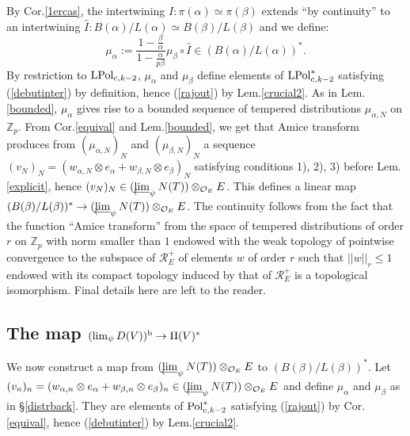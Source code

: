 \documentclass[11pt]{amsart}
\def\limproj{\mathop{\oalign{{\rm lim}\cr 
\hidewidth$\longleftarrow$\hidewidth\cr}}}
\def\Z{{\mathbb Z}_p}
\def\O{{\mathcal O}_E}
\begin{document}
By Cor.\ref{1ercas}, the intertwining $I:\pi(\alpha)\simeq \pi(\beta)$
extends ``by continuity'' to an intertwining $\hat
I:B(\alpha)/L(\alpha)\simeq B(\beta)/L(\beta)$ and we define:
$$\mu_{\alpha}:=\frac{1-\frac{\beta}{\alpha}}{1-\frac{\alpha}{p\beta}}\mu_{\beta}\circ
\hat I \in (B(\alpha)/L(\alpha))^{*}.$$  
By restriction to ${\rm LPol}_{{\rm c},k-2}$, $\mu_{\alpha}$ and
$\mu_{\beta}$ define elements of ${\rm LPol}_{{\rm c},k-2}^*$
satisfying (\ref{debutinter}) by definition, hence (\ref{rajout}) by
Lem.\ref{crucial2}. As in Lem.\ref{bounded}, $\mu_{\alpha}$ gives rise
to a bounded sequence of tempered distributions $\mu_{\alpha,N}$ on
$\Z$. From Cor.\ref{equival} and Lem.\ref{bounded}, we get that Amice
transform produces from $(\mu_{\alpha,N})_N$ and $(\mu_{\beta,N})_N$ a
sequence $(v_N)_N=(w_{\alpha,N}\otimes e_{\alpha}+w_{\beta,N}\otimes
e_{\beta})_N$ satisfying conditions 1), 2), 3) before
Lem.\ref{explicit}, hence $(v_N)_N\in
(\limproj_{\psi}N(T))\otimes_{\O}E$. This defines a linear map
$(B(\beta)/L(\beta))^{*}\rightarrow
(\limproj_{\psi}N(T))\otimes_{\O}E$. The continuity follows from the
fact that the function ``Amice transform'' from the space of tempered
distributions of order $r$ on $\Z$ with norm smaller than $1$ endowed
with the weak topology of pointwise convergence to the subspace of
${\mathcal R}_E^+$ of elements $w$ of order $r$ such that
$|\!|w|\!|_r\leq 1$ endowed with its compact topology induced by that
of ${\mathcal R}_E^+$ is a topological isomorphism. Final details here
are left to the reader.  
 
\subsection{The map $(\lim_{\psi}D(V))^{\rm b}\rightarrow \Pi(V)^*$}\label{finiso} 
 
We now construct a map from $(\limproj_{\psi}N(T))\otimes_{\O}E$ to
$(B(\beta)/L(\beta))^{*}$. Let $(v_n)_n=(w_{\alpha,n}\otimes
e_{\alpha}+w_{\beta,n}\otimes e_{\beta})_n\in
(\limproj_{\psi}N(T))\otimes_{\O}E$ and define $\mu_{\alpha}$ and
$\mu_{\beta}$ as in \S\ref{distrback}. They are elements of ${\rm
  Pol}_{{\rm c},k-2}^*$ satisfying (\ref{rajout}) by
Cor.\ref{equival}, hence (\ref{debutinter}) by Lem.\ref{crucial2}.  
 
\end{document}
